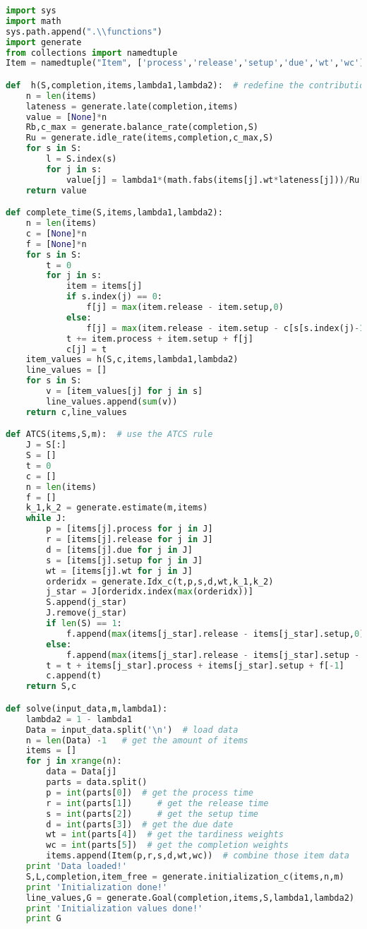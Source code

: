 \begin{lstlisting}[language = Python]
import sys
import math
sys.path.append(".\\functions")
import generate
from collections import namedtuple
Item = namedtuple("Item", ['process','release','setup','due','wt','wc'])

def  h(S,completion,items,lambda1,lambda2):  # redefine the contribution of one item for the obj function
	n = len(items)
	lateness = generate.late(completion,items)
	value = [None]*n
	Rb,c_max = generate.balance_rate(completion,S)
	Ru = generate.idle_rate(items,completion,c_max,S)
	for s in S:
		l = S.index(s)
		for j in s:
			value[j] = lambda1*(math.fabs(items[j].wt*lateness[j]))/Ru[l] + lambda2*items[j].wc*completion[j]*math.exp(-Rb)
	return value

def complete_time(S,items,lambda1,lambda2):
	n = len(items)
	c = [None]*n
	f = [None]*n
	for s in S:
		t = 0
		for j in s:
			item = items[j]
			if s.index(j) == 0:
				f[j] = max(item.release - item.setup,0)
			else:
				f[j] = max(item.release - item.setup - c[s[s.index(j)-1]],0)
			t += item.process + item.setup + f[j]
			c[j] = t
	item_values = h(S,c,items,lambda1,lambda2)
	line_values = []
	for s in S:
		v = [item_values[j] for j in s]
		line_values.append(sum(v))
	return c,line_values

def ATCS(items,S,m):  # use the ATCS rule
	J = S[:]
	S = []
	t = 0
	c = []
	n = len(items)
	f = []
	k_1,k_2 = generate.estimate(m,items)
	while J:
		p = [items[j].process for j in J]
		r = [items[j].release for j in J]
		d = [items[j].due for j in J]
		s = [items[j].setup for j in J]
		wt = [items[j].wt for j in J]
		orderidx = generate.Idx_c(t,p,s,d,wt,k_1,k_2)
		j_star = J[orderidx.index(max(orderidx))]
		S.append(j_star)
		J.remove(j_star)
		if len(S) == 1:
			f.append(max(items[j_star].release - items[j_star].setup,0))
		else:
			f.append(max(items[j_star].release - items[j_star].setup - c[ -1],0))
		t = t + items[j_star].process + items[j_star].setup + f[-1]
		c.append(t)
	return S,c

def solve(input_data,m,lambda1):
	lambda2 = 1 - lambda1
	Data = input_data.split('\n')  # load data
	n = len(Data) -1   # get the amount of items
	items = []	
	for j in xrange(n):
		data = Data[j]
		parts = data.split()
		p = int(parts[0])  # get the process time
		r = int(parts[1])	  # get the release time
		s = int(parts[2])	  # get the setup time
		d = int(parts[3])  # get the due date
		wt = int(parts[4])  # get the tardiness weights
		wc = int(parts[5])  # get the completion weights
		items.append(Item(p,r,s,d,wt,wc))  # combine those item data
	print 'Data loaded!'	
	S,L,completion,item_free = generate.initialization_c(items,n,m)
	print 'Initialization done!'
	line_values,G = generate.Goal(completion,items,S,lambda1,lambda2)
	print 'Initialization values done!'
	print G


\end{lstlisting}
